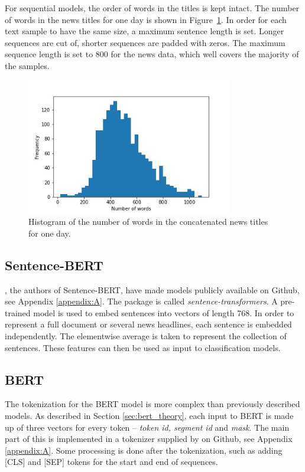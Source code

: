 For sequential models, the order of words in the titles is kept intact. The number of words in the news titles for one day is shown in Figure~\ref{fig:num_words}. In order for each text sample to have the same size, a maximum sentence length is set. Longer sequences are cut of, shorter sequences are padded with zeros. The maximum sequence length is set to 800 for the news data, which well covers the majority of the samples. 

\begin{figure}[H]
\centering
\includegraphics[width=0.8\textwidth]{Figures/wordcount.jpg}
\caption{Histogram of the number of words in the concatenated news titles for one day. }
\label{fig:num_words}
\end{figure}

\subsection{Sentence-BERT}

\citeauthor{reimers2019sentence}, the authors of Sentence-BERT,  have made models publicly available on Github, see Appendix \ref{appendix:A}. The package is called \emph{sentence-transformers}. A pre-trained model is used to embed sentences into vectors of length 768. In order to represent a full document or several news headlines, each sentence is embedded independently. The elementwise average is taken to represent the collection of sentences. These features can then be used as input to classification models. 

\subsection{BERT}

The tokenization for the BERT model is more complex than previously described models. As described in Section \ref{sec:bert_theory}, each input to BERT is made up of three vectors for every token -- \emph{token id, segment id} and \emph{mask}. The main part of this is implemented in a tokenizer supplied by \citet{devlin2018bert} on Github, see Appendix \ref{appendix:A}. Some processing is done after the tokenization, such as adding \textsc{[CLS]} and \textsc{[SEP]} tokens for the start and end of sequences. 

